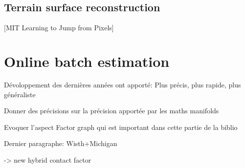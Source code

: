 \cite{scona2017direct}

\cite{hartley2018legged}  %
\cite{mattamala2021learning}



\subsection{Terrain surface reconstruction}
\cite{fankhauser2018probabilistic}
\cite{mastalli2020motion}
\cite{buchanan2021navigating}


[MIT Learning to Jump from Pixels]



\section{Online batch estimation}

Dévoloppement des dernières années ont apporté:
Plus précis, plus rapide, plus généraliste

Donner des précisions sur la précision apportée par les maths manifolds

Evoquer l'aspect Factor graph qui est important dans cette partie de la biblio

Dernier paragraphe: Wisth+Michigan

\cite{hartley2018legged}
\cite{hartley2018hybrid} -> new hybrid contact factor


\cite{dellaert2017factor}